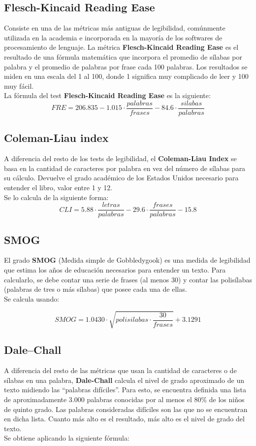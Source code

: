 \documentclass[12pt,journal,compsoc]{IEEEtran}
\begin{document}
\subsection{Flesch-Kincaid Reading Ease}
Consiste en una de las métricas más antiguas de legibilidad, comúnmente utilizada en la academia e incorporada en la mayoría de los softwares de procesamiento de lenguaje. La métrica \textbf{Flesch-Kincaid Reading Ease} es el resultado de una fórmula matemática que incorpora el promedio de sílabas por palabra y el promedio de palabras por frase cada 100 palabras. Los resultados se miden en una escala del 1 al 100, donde 1 significa muy complicado de leer y 100 muy fácil.\\
La fórmula del test \textbf{Flesch-Kincaid Reading Ease} es la siguiente:
$$FRE = 206.835 - 1.015\cdot \frac{palabras}{frases} - 84.6\cdot \frac{silabas}{palabras}$$

\subsection{Coleman-Liau index}
A diferencia del resto de los tests de legibilidad, el \textbf{Coleman-Liau Index} se basa en la cantidad de caracteres por palabra en vez del número de sílabas para su cálculo. Devuelve el grado académico de los Estados Unidos necesario para entender el libro, valor entre 1 y 12.\\
Se lo calcula de la siguiente forma: 
$$CLI = 5.88 \cdot \frac{letras}{palabras} - 29.6 \cdot \frac{frases}{palabras} - 15.8$$

\subsection{SMOG}
El grado \textbf{SMOG} (Medida simple de Gobbledygook) es una medida de legibilidad que estima los años de educación necesarios para entender un texto. Para calcularlo, se debe contar una serie de frases (al menos 30) y contar las polisílabas (palabras de tres o más sílabas) que posee cada una de ellas.\\ 
Se calcula usando: 

$$SMOG = 1.0430\cdot \sqrt{polisilabas \cdot \frac{30}{frases}} + 3.1291$$

\subsection{Dale–Chall}
A diferencia del resto de las métricas que usan la cantidad de caracteres o de sílabas en una palabra, \textbf{Dale-Chall} calcula el nivel de grado aproximado de un texto midiendo las ``palabras difíciles''. Para esto, se encuentra definida una lista de aproximadamente 3.000 palabras conocidas por al menos el 80\% de los niños de quinto grado. Las palabras consideradas difíciles son las que no se encuentran en dicha lista. Cuanto más alto es el resultado, más alto es el nivel de grado del texto. 
\\Se obtiene aplicando la siguiente fórmula:
\end{document}
